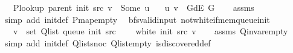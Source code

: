 \begin{isabellebody}
\ \ \ {\isachardoublequoteopen}P{\isacharunderscore}{\kern0pt}lookup\ {\isacharparenleft}{\kern0pt}parent\ {\isacharparenleft}{\kern0pt}init\ src{\isacharparenright}{\kern0pt}{\isacharparenright}{\kern0pt}\ v\ {\isacharequal}{\kern0pt}\ Some\ u{\isachardoublequoteclose}\isanewline
\ \ \ {\isachardoublequoteopen}{\isacharparenleft}{\kern0pt}u{\isacharcomma}{\kern0pt}\ v{\isacharparenright}{\kern0pt}\ {\isasymin}\ G{\isachardot}{\kern0pt}dE\ G{\isachardoublequoteclose}%
\endisataginvisible
{\isafoldinvisible}%
%
\isadeliminvisible
\isanewline
%
\endisadeliminvisible
%
\isadelimproof
\ \ %
\endisadelimproof
%
\isatagproof
{}\isamarkupfalse%
\ assms\isanewline
\ \ \isamarkupfalse%
\ {\isacharparenleft}{\kern0pt}simp\ add{\isacharcolon}{\kern0pt}\ init{\isacharunderscore}{\kern0pt}def\ P{\isachardot}{\kern0pt}map{\isacharunderscore}{\kern0pt}empty{\isacharparenright}{\kern0pt}%
\endisatagproof
{\isafoldproof}%
%
\isadelimproof
\isanewline
%
\endisadelimproof
%
\isadeliminvisible
\isanewline
%
\endisadeliminvisible
%
\isataginvisible
{}\isamarkupfalse%
\ {\isacharparenleft}{\kern0pt}\ bfs{\isacharunderscore}{\kern0pt}valid{\isacharunderscore}{\kern0pt}input{\isacharparenright}{\kern0pt}\ not{\isacharunderscore}{\kern0pt}white{\isacharunderscore}{\kern0pt}if{\isacharunderscore}{\kern0pt}mem{\isacharunderscore}{\kern0pt}queue{\isacharunderscore}{\kern0pt}init{\isacharcolon}{\kern0pt}\isanewline
\ \ \ {\isachardoublequoteopen}v\ {\isasymin}\ set\ {\isacharparenleft}{\kern0pt}Q{\isacharunderscore}{\kern0pt}list\ {\isacharparenleft}{\kern0pt}queue\ {\isacharparenleft}{\kern0pt}init\ src{\isacharparenright}{\kern0pt}{\isacharparenright}{\kern0pt}{\isacharparenright}{\kern0pt}{\isachardoublequoteclose}\isanewline
\ \ \ {\isachardoublequoteopen}{\isasymnot}\ white\ {\isacharparenleft}{\kern0pt}init\ src{\isacharparenright}{\kern0pt}\ v{\isachardoublequoteclose}%
\endisataginvisible
{\isafoldinvisible}%
%
\isadeliminvisible
\isanewline
%
\endisadeliminvisible
%
\isadelimproof
\ \ %
\endisadelimproof
%
\isatagproof
{}\isamarkupfalse%
\ assms\ Q{\isachardot}{\kern0pt}invar{\isacharunderscore}{\kern0pt}empty\isanewline
\ \ \isamarkupfalse%
\ {\isacharparenleft}{\kern0pt}simp\ add{\isacharcolon}{\kern0pt}\ init{\isacharunderscore}{\kern0pt}def\ Q{\isachardot}{\kern0pt}list{\isacharunderscore}{\kern0pt}snoc\ Q{\isachardot}{\kern0pt}list{\isacharunderscore}{\kern0pt}empty\ is{\isacharunderscore}{\kern0pt}discovered{\isacharunderscore}{\kern0pt}def{\isacharparenright}{\kern0pt}%

\end{isabellebody}
